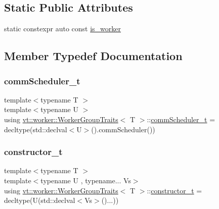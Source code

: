 \subsection*{Static Public Attributes}
\begin{DoxyCompactItemize}
\item 
static constexpr auto const \hyperlink{structvt_1_1worker_1_1_worker_group_traits_ad95cbaac5da30e1904ed5ad8b7f61edc}{is\+\_\+worker}
\end{DoxyCompactItemize}


\subsection{Member Typedef Documentation}
\mbox{\label{structvt_1_1worker_1_1_worker_group_traits_a97c79042b7a6588067d2fdf836fc38ab}} 
\subsubsection{\texorpdfstring{comm\+Scheduler\+\_\+t}{commScheduler\_t}}
{\footnotesize\ttfamily template$<$typename T $>$ \\
template$<$typename U $>$ \\
using \hyperlink{structvt_1_1worker_1_1_worker_group_traits}{vt\+::worker\+::\+Worker\+Group\+Traits}$<$ T $>$\+::\hyperlink{structvt_1_1worker_1_1_worker_group_traits_a97c79042b7a6588067d2fdf836fc38ab}{comm\+Scheduler\+\_\+t} =  decltype(std\+::declval$<$U$>$().comm\+Scheduler())}

\mbox{\label{structvt_1_1worker_1_1_worker_group_traits_a637c87b51f757c6925f235f64c426f4e}} 
\subsubsection{\texorpdfstring{constructor\+\_\+t}{constructor\_t}}
{\footnotesize\ttfamily template$<$typename T $>$ \\
template$<$typename U , typename... Vs$>$ \\
using \hyperlink{structvt_1_1worker_1_1_worker_group_traits}{vt\+::worker\+::\+Worker\+Group\+Traits}$<$ T $>$\+::\hyperlink{structvt_1_1worker_1_1_worker_group_traits_a637c87b51f757c6925f235f64c426f4e}{constructor\+\_\+t} =  decltype(U(std\+::declval$<$Vs$>$()...))}

